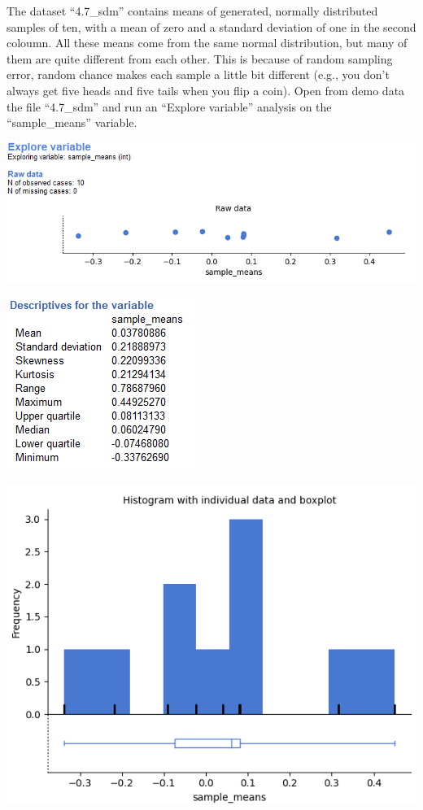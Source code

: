 \documentclass[
]{book}
\begin{document}
The dataset ``4.7\_sdm'' contains means of generated, normally distributed samples of ten, with a mean of zero and a standard deviation of one in the second coloumn. All these means come from the same normal distribution, but many of them are quite different from each other. This is because of random sampling error, random chance makes each sample a little bit different (e.g., you don't always get five heads and five tails when you flip a coin). Open from demo data the file ``4.7\_sdm'' and run an ``Explore variable'' analysis on the ``sample\_means'' variable.

\includegraphics{img/ch4/4.6expvarsamplemeansRAW.png}

\includegraphics{img/ch4/4.6samplemeansdescriptives.png}

\includegraphics{img/ch4/4.6samplemeanshisto.png}
\end{document}

